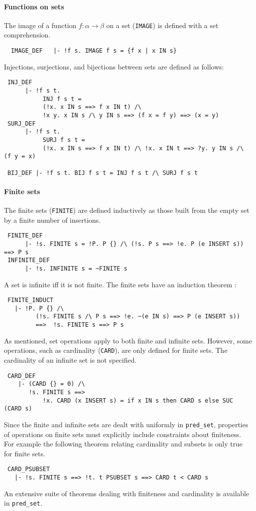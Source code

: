 \paragraph{Functions on sets}
The image of a function $f :\alpha \to \beta$ on
a set ({\small\verb+IMAGE+}) is defined with a set comprehension.
{\small
\begin{verbatim}
  IMAGE_DEF   |- !f s. IMAGE f s = {f x | x IN s}
\end{verbatim}}
%
Injections, surjections, and bijections between sets are defined
as follows:
%
{\small
\begin{verbatim}
 INJ_DEF
      |- !f s t.
           INJ f s t =
           (!x. x IN s ==> f x IN t) /\
           !x y. x IN s /\ y IN s ==> (f x = f y) ==> (x = y)
 SURJ_DEF
      |- !f s t.
           SURJ f s t =
           (!x. x IN s ==> f x IN t) /\ !x. x IN t ==> ?y. y IN s /\ (f y = x)

 BIJ_DEF |- !f s t. BIJ f s t = INJ f s t /\ SURJ f s t
\end{verbatim}}
%
\paragraph{Finite sets}
The finite sets ({\small\verb+FINITE+}) are defined inductively as those
built from the empty set by a finite number of insertions.
%
{\small
\begin{verbatim}
 FINITE_DEF
      |- !s. FINITE s = !P. P {} /\ (!s. P s ==> !e. P (e INSERT s)) ==> P s
 INFINITE_DEF
      |- !s. INFINITE s = ~FINITE s
\end{verbatim}}
%
A set is infinite iff it is not finite. The finite sets have an
induction theorem :
%
{\small
\begin{verbatim}
 FINITE_INDUCT
   |- !P. P {} /\
         (!s. FINITE s /\ P s ==> !e. ~(e IN s) ==> P (e INSERT s))
         ==>  !s. FINITE s ==> P s
\end{verbatim}}
%
As mentioned, set operations apply to both finite and infinite
sets. However, some operations, such as cardinality
({\small\verb+CARD+}), are only defined for finite sets.  The
cardinality of an infinite set is not specified.
%
{\small
\begin{verbatim}
 CARD_DEF
    |- (CARD {} = 0) /\
       !s. FINITE s ==>
           !x. CARD (x INSERT s) = if x IN s then CARD s else SUC (CARD s)
\end{verbatim}}
%
Since the finite and infinite sets are dealt with uniformly in
 {\small\verb+pred_set+}, properties of operations on finite sets must
explicitly include constraints about finiteness. For example the
following theorem relating cardinality and subsets is only true
for finite sets.
%
{\small
\begin{verbatim}
 CARD_PSUBSET
   |- !s. FINITE s ==> !t. t PSUBSET s ==> CARD t < CARD s
\end{verbatim}}
%
An extensive suite of theorems dealing with finiteness and cardinality
is available in {\small\verb+pred_set+}.

